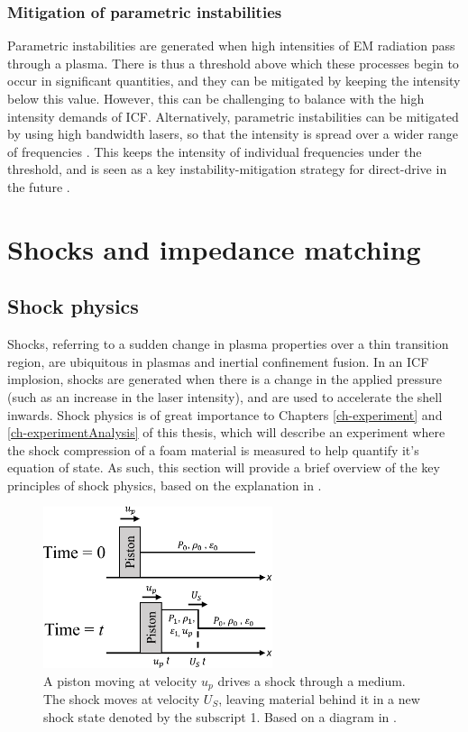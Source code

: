 \subsubsection{Mitigation of parametric instabilities}
Parametric instabilities are generated when high intensities of EM radiation pass through a plasma. There is thus a threshold above which these processes begin to occur in significant quantities, and they can be mitigated by keeping the intensity below this value. However, this can be challenging to balance with the high intensity demands of ICF. Alternatively, parametric instabilities can be mitigated by using high bandwidth lasers, so that the intensity is spread over a wider range of frequencies \cite{Follett2018}. This keeps the intensity of individual frequencies under the threshold, and is seen as a key instability-mitigation strategy for direct-drive in the future \cite{Campbell2021a}.


\section{Shocks and impedance matching}

\subsection{Shock physics}

Shocks, referring to a sudden change in plasma properties over a thin transition region, are ubiquitous in plasmas and inertial confinement fusion. In an ICF implosion, shocks are generated when there is a change in the applied pressure (such as an increase in the laser intensity), and are used to accelerate the shell inwards. Shock physics is of great importance to Chapters \ref{ch-experiment} and \ref{ch-experimentAnalysis} of this thesis, which will describe an experiment where the shock compression of a foam material is measured to help quantify it's equation of state. As such, this section will provide a brief overview of the key principles of shock physics, based on the explanation in \cite{Zeldovich1966}.

\begin{figure}
\centering
\includegraphics[width=0.6\textwidth]{figures/Theory/Piston.pdf}%
\caption{\label{fig:Piston} A piston moving at velocity $u_p$ drives a shock through a medium. The shock moves at velocity $U_S$, leaving material behind it in a new shock state denoted by the subscript 1. Based on a diagram in \cite{Zeldovich1966}.}
\end{figure}

